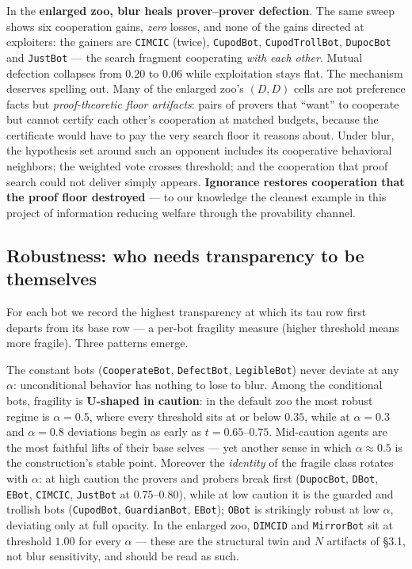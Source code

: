 \documentclass[11pt]{article}
\newcommand{\zoobot}[1]{\texttt{#1}}
\newcommand{\dupoc}{\zoobot{DupocBot}}
\newcommand{\cupod}{\zoobot{CupodBot}}
\newcommand{\cimcic}{\zoobot{CIMCIC}}
\newcommand{\dimcid}{\zoobot{DIMCID}}
\begin{document}
In the \textbf{enlarged zoo, blur heals prover--prover defection}. The
same sweep shows six cooperation gains, \emph{zero} losses, and none of
the gains directed at exploiters: the gainers are \cimcic{} (twice),
\cupod, \zoobot{CupodTrollBot}, \dupoc{} and \zoobot{JustBot} --- the
search fragment cooperating \emph{with each other}. Mutual defection
collapses from $0.20$ to $0.06$ while exploitation stays flat. The
mechanism deserves spelling out. Many of the enlarged zoo's $(D,D)$ cells
are not preference facts but \emph{proof-theoretic floor artifacts}: pairs
of provers that ``want'' to cooperate but cannot certify each other's
cooperation at matched budgets, because the certificate would have to pay
the very search floor it reasons about. Under blur, the hypothesis set
around such an opponent includes its cooperative behavioral neighbors;
the weighted vote crosses threshold; and the cooperation that proof
search could not deliver simply appears. \textbf{Ignorance restores
cooperation that the proof floor destroyed} --- to our knowledge the
cleanest example in this project of information reducing welfare through
the provability channel.

\subsection{Robustness: who needs transparency to be themselves}

For each bot we record the highest transparency at which its tau row first
departs from its base row --- a per-bot fragility measure (higher
threshold means more fragile). Three patterns emerge.

The constant bots (\zoobot{CooperateBot}, \zoobot{DefectBot},
\zoobot{LegibleBot}) never deviate at any $\alpha$: unconditional
behavior has nothing to lose to blur. Among the conditional bots,
fragility is \textbf{U-shaped in caution}: in the default zoo the most
robust regime is $\alpha = 0.5$, where every threshold sits at or below
$0.35$, while at $\alpha = 0.3$ and $\alpha = 0.8$ deviations begin as
early as $t = 0.65$--$0.75$. Mid-caution agents are the most faithful
lifts of their base selves --- yet another sense in which
$\alpha \approx 0.5$ is the construction's stable point. Moreover the
\emph{identity} of the fragile class rotates with $\alpha$: at high
caution the provers and probers break first (\dupoc, \zoobot{DBot},
\zoobot{EBot}, \cimcic, \zoobot{JustBot} at $0.75$--$0.80$), while at low
caution it is the guarded and trollish bots (\cupod, \zoobot{GuardianBot},
\zoobot{EBot}); \zoobot{OBot} is strikingly robust at low $\alpha$,
deviating only at full opacity. In the enlarged zoo, \dimcid{} and
\zoobot{MirrorBot} sit at threshold $1.00$ for every $\alpha$ --- these
are the structural twin and $N$ artifacts of \S 3.1, not blur
sensitivity, and should be read as such.
\end{document}
